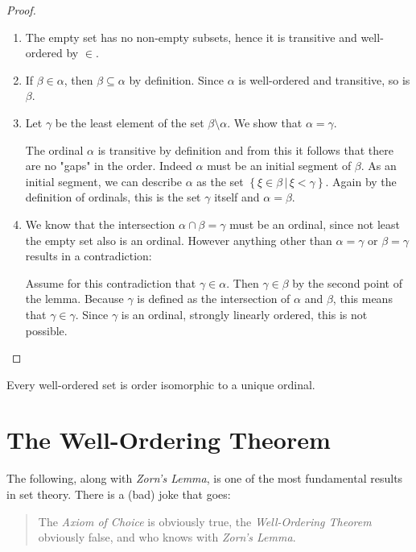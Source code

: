 \documentclass[../../main.tex]{subfiles}
\begin{document}
\begin{proof}\cite[Lemma 2.3, p.15]{Jec78}
    \begin{enumerate}
        \item The empty set has no non-empty subsets, hence it is transitive and well-ordered by $\in$.
        \item If $\beta \in \alpha$, then $\beta \subseteq \alpha$ by definition. Since $\alpha$ is well-ordered and transitive, so is $\beta$.
        \item Let $\gamma$ be the least element of the set $\beta \setminus \alpha$. We show that $\alpha = \gamma$.
        
        The ordinal $\alpha$ is transitive by definition and from this it follows that there are no "gaps" in the order. Indeed $\alpha$ must be an initial segment of $\beta$.
        As an initial segment, we can describe $\alpha$ as the set $\left\{\xi \in \beta \,\vert\, \xi < \gamma\right\}$.
        Again by the definition of ordinals, this is the set $\gamma$ itself and $\alpha = \beta$.
        \item We know that the intersection $\alpha \cap \beta = \gamma$ must be an ordinal, since not least the empty set also is an ordinal.
        However anything other than $\alpha = \gamma$ or $\beta = \gamma$ results in a contradiction:
        
        Assume for this contradiction that $\gamma \in \alpha$. Then $\gamma \in \beta$ by the second point of the lemma. 
        Because $\gamma$ is defined as the intersection of $\alpha$ and $\beta$, this means that $\gamma \in \gamma$.
        Since $\gamma$ is an ordinal, strongly linearly ordered, this is not possible. \qedhere
    \end{enumerate}
\end{proof}

\begin{theorem}\label{unique-ordinal}\cite[Theorem 2, p.15]{Jec78}
    Every well-ordered set is order isomorphic to a unique ordinal.
\end{theorem}

\section{The Well-Ordering Theorem}
The following, along with \textit{Zorn's Lemma}, is one of the most fundamental results in set theory.
There is a (bad) joke that goes:
\begin{quote} %
    The \textit{Axiom of Choice} is obviously true, the \textit{Well-Ordering Theorem} obviously false, 
    and who knows with \textit{Zorn's Lemma}.
\end{quote}
\end{document}
